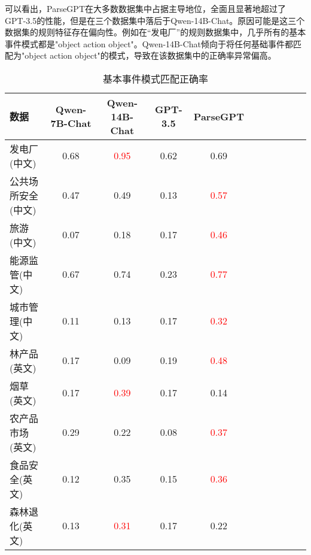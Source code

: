 可以看出，ParseGPT在大多数数据集中占据主导地位，全面且显著地超过了GPT-3.5的性能，但是在三个数据集中落后于Qwen-14B-Chat。原因可能是这三个数据集的规则特征存在偏向性。例如在“发电厂”的规则数据集中，几乎所有的基本事件模式都是"object action object"。Qwen-14B-Chat倾向于将任何基础事件都匹配为"object action object"的模式，导致在该数据集中的正确率异常偏高。


\begin{table*}[!t]
\centering
\caption{基本事件模式匹配正确率}
\begin{tabular}{@{}lcccccccccc@{}}
\toprule
数据 & {Qwen-7B-Chat} & {Qwen-14B-Chat} & {GPT-3.5}  & {ParseGPT} \\
\midrule
发电厂(中文) &0.68  &\textcolor{red}{0.95}  &0.62   &0.69  \\
公共场所安全(中文) &0.47 &0.49  &0.13   &\textcolor{red}{0.57}  \\
旅游(中文) &0.07 &0.18  &0.17   &\textcolor{red}{0.46}  \\
能源监管(中文) &0.67  &0.74  &0.23   &\textcolor{red}{0.77}  \\
城市管理(中文) &0.11  &0.13  &0.17   & \textcolor{red}{0.32} \\
林产品(英文) &0.17  &0.09  &0.19   &\textcolor{red}{0.48}  \\
烟草(英文) &0.17  &\textcolor{red}{0.39}  &0.17   &0.14  \\
农产品市场(英文) &0.29  &0.22  &0.08   &\textcolor{red}{0.37}  \\
食品安全(英文) &0.12  &0.35  &0.15   &\textcolor{red}{0.36}  \\
森林退化(英文) &0.13  &\textcolor{red}{0.31}  &0.17  &0.22  \\
\bottomrule
\end{tabular}
\end{table*}
